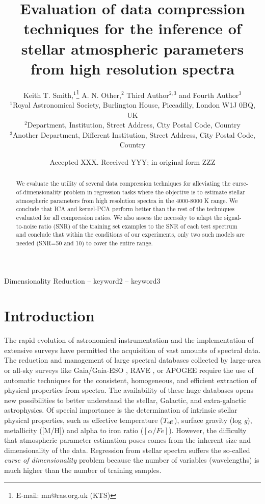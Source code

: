 \documentclass[a4paper,fleqn,usenatbib]{mnras}
\title[Short title, max. 45 characters]{Evaluation of data compression techniques for the inference of
  stellar atmospheric parameters from high resolution spectra}
\author[K. T. Smith et al.]{
Keith T. Smith,$^{1}$\thanks{E-mail: mn@ras.org.uk (KTS)}
A. N. Other,$^{2}$
Third Author$^{2,3}$
and Fourth Author$^{3}$
\\
$^{1}$Royal Astronomical Society, Burlington House, Piccadilly, London W1J 0BQ, UK\\
$^{2}$Department, Institution, Street Address, City Postal Code, Country\\
$^{3}$Another Department, Different Institution, Street Address, City Postal Code, Country
}
\date{Accepted XXX. Received YYY; in original form ZZZ}
\begin{document}
\label{firstpage}
\pagerange{\pageref{firstpage}--\pageref{lastpage}}
\maketitle

\begin{abstract}
We evaluate the utility of several data compression techniques
  for alleviating the curse-of-dimensionality problem in regression
  tasks where the objective is to estimate stellar atmospheric
  parameters from high resolution spectra in the 4000-8000 K range. We
  conclude that ICA and kernel-PCA perform better than the rest of the
  techniques evaluated for all compression ratios. We also assess the
  necessity to adapt the signal-to-noise ratio (SNR) of the training
  set examples to the SNR of each test spectrum and conclude that
  within the conditions of our experiments, only two such models are
  needed (SNR=50 and 10) to cover the entire range.
\end{abstract}

\begin{keywords}
Dimensionality Reduction -- keyword2 -- keyword3
\end{keywords}



\section{Introduction}

The rapid evolution of astronomical instrumentation and the
implementation of extensive surveys have permitted the acquisition of
vast amounts of spectral data.  The reduction and management of large
spectral databases collected by large-area or all-sky surveys like
Gaia/Gaia-ESO \citep{2006MNRAS.367..290J,2012Msngr.147...25G}, RAVE
\citep{2006AJ....132.1645S}, or APOGEE \citep{2011AJ....142...72E}
require the use of automatic techniques for the consistent,
homogeneous, and efficient extraction of physical properties from
spectra. The availability of these huge databases opens new
possibilities to better understand the stellar, Galactic, and
extra-galactic astrophysics. Of special importance is the
determination of intrinsic stellar physical properties, such as
effective temperature ($T_{\rm eff}$), surface gravity (log
\textit{g}), metallicity ([M/H]) and alpha to iron ratio 
($\left[ \alpha/Fe \right]$). However, the difficulty that
atmospheric parameter estimation poses comes from the inherent size
and dimensionality of the data.  Regression from stellar spectra
suffers the so-called {\sl curse of dimensionality} problem because
the number of variables (wavelengths) is much higher than the number
of training samples. 
    
\end{document}
